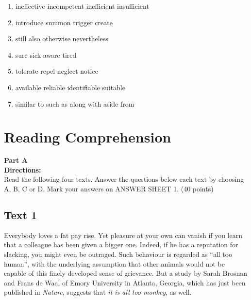 {\begin{enumerate}
\fourchoices
{subjected}
{left}
{drawn}
{exposed}




\item

\fourchoices
{ineffective}
{incompetent}
{inefficient}
{insufficient}


\item


\fourchoices
{introduce}
{summon}
{trigger}
{create}




\item


\fourchoices
{still}
{also}
{otherwise}
{nevertheless}




\item


\fourchoices
{sure}
{sick}
{aware}
{tired}




\item


\fourchoices
{tolerate}
{repel}
{neglect}
{notice}




\item

\fourchoices
{available}
{reliable}
{identifiable}
{suitable}


\item


\fourchoices
{similar to}
{such as}
{along with}
{aside from}



\end{enumerate}

\vfil

\section{Reading Comprehension}


\noindent
\textbf{Part A}\\
\textbf{Directions:}\\
Read the following four texts. Answer the questions below each
	text by choosing A, B, C or
	D. Mark your answers
	on ANSWER SHEET 1. (40 points)

\newpage
\subsection{Text 1}


Everybody loves a fat pay rise. Yet pleasure at your own can vanish if
you learn that a colleague has been given a bigger one. Indeed, if he
has a reputation for slacking, you might even be outraged. Such
behaviour is regarded as ``all too human'', with the underlying
assumption that other animals would not be capable of this finely
developed sense of grievance. But a study by Sarah Brosnan and Frans de
Waal of Emory University in Atlanta, Georgia, which has just been
published in \emph{Nature}, suggests that  \emph{it is all too monkey}, as well.

}
